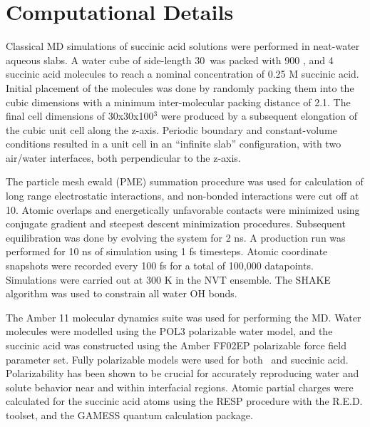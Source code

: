 \section {Computational Details}

Classical MD simulations of succinic acid solutions were performed in neat-water aqueous slabs. A water cube of side-length 30\angs~was packed with 900 \wat, and 4 succinic acid molecules to reach a nominal concentration of 0.25 M succinic acid. Initial placement of the molecules was done by randomly packing them into the cubic dimensions with a minimum inter-molecular packing distance of 2.1\angs.\cite{Martinez2009, Martinez2003} The final cell dimensions of 30x30x100\angs$^3$ were produced by a subsequent elongation of the cubic unit cell along the z-axis. Periodic boundary and constant-volume conditions resulted in a unit cell in an ``infinite slab'' configuration, with two air/water interfaces, both perpendicular to the z-axis.\cite{Wilson1991}

The particle mesh ewald (PME) summation procedure was used for calculation of long range electrostatic interactions, and non-bonded interactions were cut off at 10\angs.\cite{Essmann1995} Atomic overlaps and energetically unfavorable contacts were minimized using conjugate gradient and steepest descent minimization procedures. Subsequent equilibration was done by evolving the system for 2 ns. A production run was performed for 10 ns of simulation using 1 fs timesteps. Atomic coordinate snapshots were recorded every 100 fs for a total of 100,000 datapoints. Simulations were carried out at 300 K in the NVT ensemble. The SHAKE algorithm was used to constrain all water OH bonds.\cite{Ryckaert1977}

The Amber 11 molecular dynamics suite was used for performing the MD.\cite{Case2010} Water molecules were modelled using the POL3 polarizable water model,\cite{Dang1992, Caldwell1995} and the succinic acid was constructed using the Amber FF02EP polarizable force field parameter set. Fully polarizable models were used for both \wat~and succinic acid. Polarizability has been shown to be crucial for accurately reproducing water and solute behavior near and within interfacial regions.\cite{Dang1998} Atomic partial charges were calculated for the succinic acid atoms using the RESP procedure with the R.E.D. toolset, and the GAMESS quantum calculation package.\cite{Pigache2004, Dupradeau2010, Schmidt1993}
